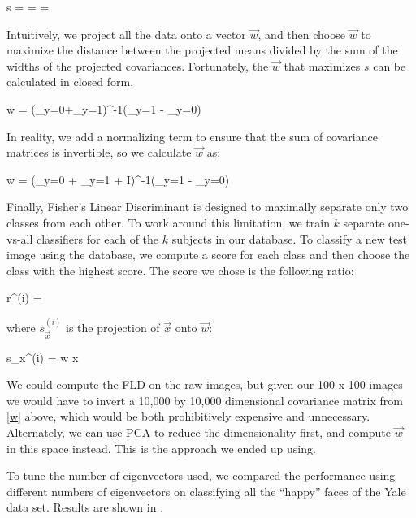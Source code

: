 \be
s = =  = 
\ee

\noindent Intuitively, we project all the data onto a vector $\vec w$,
and then choose $\vec w$ to maximize the distance between the
projected means divided by the sum of the widths of the projected
covariances.  Fortunately, the $\vec w$ that maximizes $s$ can be
calculated in closed form.

\be
\vec w = (\Sigma_{y=0}+\Sigma_{y=1})^{-1}(\vec \mu_{y=1} - \vec \mu_{y=0})
\ee

\noindent In reality, we add a normalizing term to ensure that the sum
of covariance matrices is invertible, so we calculate $\vec w$ as:

\be
\vec w = (\Sigma_{y=0} + \Sigma_{y=1} + \epsilon I)^{-1}(\vec \mu_{y=1} - \vec \mu_{y=0})
\ee

Finally, Fisher's Linear Discriminant is designed to maximally
separate only two classes from each other.  To work around this
limitation, we train $k$ separate one-vs-all classifiers for each of
the $k$ subjects in our database.  To classify a new test image using
the database, we compute a score for each class and then choose the
class with the highest score.  The score we chose is the following
ratio:

\be
r^{(i)} = 
\ee


\noindent where $s_{\vec x}^{(i)}$ is the projection of $\vec x$ onto $\vec w$:

\be
s_{\vec x}^{(i)} = \vec w \cdot \vec x
\ee

We could compute the FLD on the raw images, but given our 100 x 100
images we would have to invert a 10,000 by 10,000 dimensional
covariance matrix from \eqref{w} above, which would be both
prohibitively expensive and unnecessary.  Alternately, we can use PCA
to reduce the dimensionality first, and compute $\vec w$ in this space
instead.  This is the approach we ended up using.

To tune the number of eigenvectors used, we compared the performance
using different numbers of eigenvectors on classifying all the
``happy'' faces of the Yale data set.  Results are shown in
.






